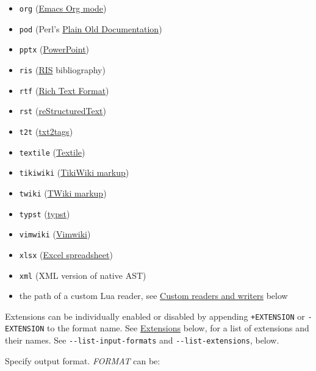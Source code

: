 \documentclass[
]{article}
\begin{document}
\begin{description}
\begin{itemize}
  \texttt{opml} (\href{https://opml.org/spec2.opml}{OPML})
\item
  \texttt{org} (\href{https://orgmode.org}{Emacs Org mode})
\item
  \texttt{pod} (Perl's \href{https://perldoc.perl.org/perlpod}{Plain Old
  Documentation})
\item
  \texttt{pptx}
  (\href{https://en.wikipedia.org/wiki/Microsoft_PowerPoint}{PowerPoint})
\item
  \texttt{ris}
  (\href{https://en.wikipedia.org/wiki/RIS_(file_format)}{RIS}
  bibliography)
\item
  \texttt{rtf}
  (\href{https://en.wikipedia.org/wiki/Rich_Text_Format}{Rich Text
  Format})
\item
  \texttt{rst}
  (\href{https://docutils.sourceforge.io/docs/ref/rst/introduction.html}{reStructuredText})
\item
  \texttt{t2t} (\href{https://txt2tags.org}{txt2tags})
\item
  \texttt{textile} (\href{https://textile-lang.com}{Textile})
\item
  \texttt{tikiwiki}
  (\href{https://doc.tiki.org/Wiki-Syntax-Text\#The_Markup_Language_Wiki-Syntax}{TikiWiki
  markup})
\item
  \texttt{twiki}
  (\href{https://twiki.org/cgi-bin/view/TWiki/TextFormattingRules}{TWiki
  markup})
\item
  \texttt{typst} (\href{https://typst.app}{typst})
\item
  \texttt{vimwiki} (\href{https://vimwiki.github.io}{Vimwiki})
\item
  \texttt{xlsx}
  (\href{https://en.wikipedia.org/wiki/Microsoft_Excel\#File_formats}{Excel
  spreadsheet})
\item
  \texttt{xml} (XML version of native AST)
\item
  the path of a custom Lua reader, see
  \protect\hyperlink{custom-readers-and-writers}{Custom readers and
  writers} below
\end{itemize}

Extensions can be individually enabled or disabled by appending
\texttt{+EXTENSION} or \texttt{-EXTENSION} to the format name. See
\protect\hyperlink{extensions}{Extensions} below, for a list of
extensions and their names. See \texttt{-\/-list-input-formats} and
\texttt{-\/-list-extensions}, below.
\item[\texttt{-t} \emph{FORMAT}, \texttt{-w} \emph{FORMAT},
\texttt{-\/-to=}\emph{FORMAT}, \texttt{-\/-write=}\emph{FORMAT}]
Specify output format. \emph{FORMAT} can be:


\end{description}
\end{document}
